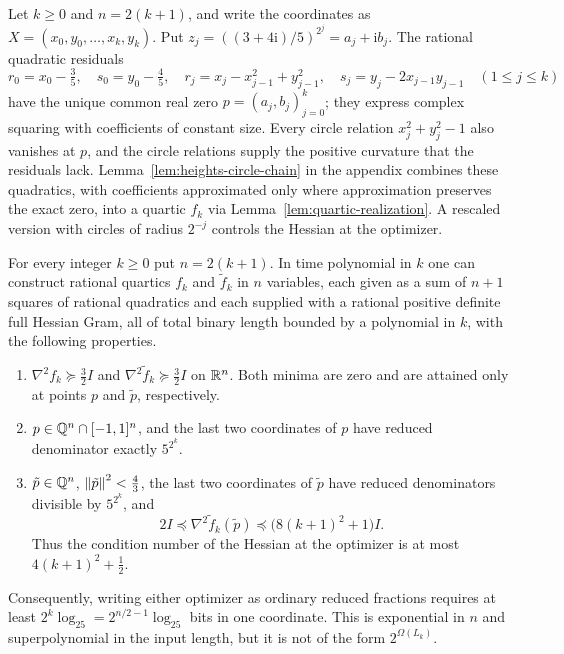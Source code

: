 Let $k\ge0$ and $n=2(k+1)$, and write the coordinates as
$X=(x_0,y_0,\ldots,x_k,y_k)$. Put $z_j=((3+4\mathrm i)/5)^{2^j}=a_j+\mathrm ib_j$.
The rational quadratic residuals
\begin{equation}
 r_0=x_0-\tfrac35,\quad s_0=y_0-\tfrac45,\quad
 r_j=x_j-x_{j-1}^2+y_{j-1}^2,\quad s_j=y_j-2x_{j-1}y_{j-1}\quad(1\le j\le k)
 \label{eq:heights-circle-residuals}
\end{equation}
have the unique common real zero $p=(a_j,b_j)_{j=0}^k$; they express complex
squaring with coefficients of constant size. Every circle relation
$x_j^2+y_j^2-1$ also vanishes at $p$, and the circle relations supply the
positive curvature that the residuals lack. Lemma~\ref{lem:heights-circle-chain}
in the appendix combines these quadratics, with coefficients approximated
only where approximation preserves the exact zero, into a quartic $f_k$ via
Lemma~\ref{lem:quartic-realization}. A rescaled version with circles of radius
$2^{-j}$ controls the Hessian at the optimizer.

\begin{theorem}
\label{thm:rational-height}
For every integer $k\ge0$ put $n=2(k+1)$. In time polynomial in $k$ one can
construct rational quartics $f_k$ and $\tilde f_k$ in $n$ variables, each
given as a sum of $n+1$ squares of rational quadratics and each supplied with
a rational positive definite full Hessian Gram, all of total binary length
bounded by a polynomial in $k$, with the following properties.
\begin{enumerate}[label=(\alph*)]
\item $\nabla^2f_k\succeq\frac32I$ and $\nabla^2\tilde f_k\succeq\frac32I$ on
  $\mathbb R^n$. Both minima are zero and are attained only at points $p$ and
  $\tilde p$, respectively.
\item $p\in\mathbb Q^n\cap[-1,1]^n$, and the last two coordinates of $p$ have reduced
  denominator exactly $5^{2^k}$.
\item $\tilde p\in\mathbb Q^n$, $\left\lVert\tilde p\right\rVert^2<\frac43$, the last two coordinates
  of $\tilde p$ have reduced denominators divisible by $5^{2^k}$, and
  \[
   2I\preceq\nabla^2\tilde f_k(\tilde p)\preceq\bigl(8(k+1)^2+1\bigr)I.
  \]
  Thus the condition number of the Hessian at the optimizer is at most
  $4(k+1)^2+\frac12$.
\end{enumerate}
Consequently, writing either optimizer as ordinary reduced fractions requires
at least $2^k\log_25=2^{n/2-1}\log_25$ bits in one coordinate. This is
exponential in $n$ and superpolynomial in the input length, but it is not of
the form $2^{\Omega(L_k)}$.
\end{theorem}

